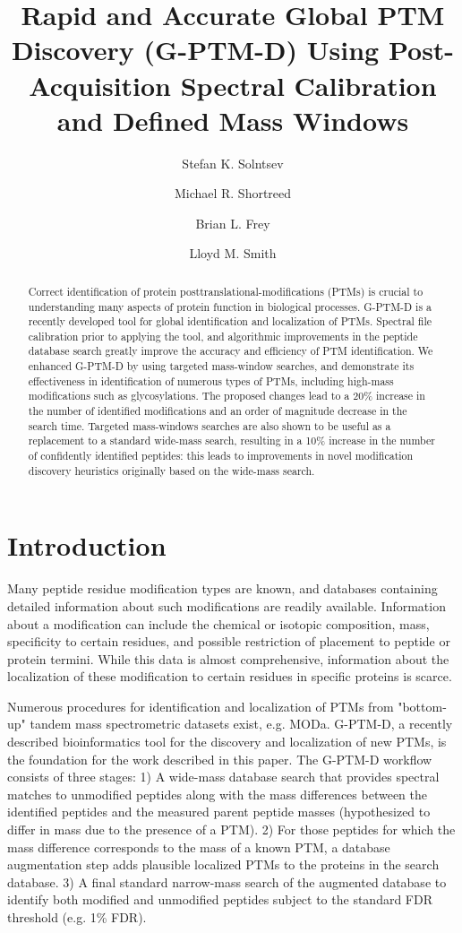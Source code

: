 \documentclass[journal=jprobs,manuscript=article]{achemso}
\author{Stefan K. Solntsev}
\author{Michael R. Shortreed}
\author{Brian L. Frey}
\author{Lloyd M. Smith}
\affiliation[UwMadison]
{University of Wisconsin-Madison}
\title[Rapid and Accurate Global PTM Discovery (G-PTM-D) Using Post-Acquisition Spectral Calibration and Defined Mass Windows]
  {Rapid and Accurate Global PTM Discovery (G-PTM-D) Using Post-Acquisition Spectral Calibration and Defined Mass Windows}
\begin{document}
\begin{abstract}

Correct identification of protein posttranslational-modifications (PTMs) is crucial to understanding many aspects of protein function in biological processes.
G-PTM-D\cite{Li_2016} is a recently developed tool for global identification and localization of PTMs.
Spectral file calibration prior to applying the tool, and algorithmic improvements in the peptide database search greatly improve the accuracy and efficiency of PTM identification.
We enhanced G-PTM-D by using targeted mass-window searches, and demonstrate its effectiveness in identification of numerous types of PTMs, including high-mass modifications such as glycosylations.
The proposed changes lead to a 20\% increase in the number of identified modifications and an order of magnitude decrease in the search time.
Targeted mass-windows searches are also shown to be useful as a replacement to a standard wide-mass search, resulting in a 10\% increase in the number of confidently identified peptides: this leads to improvements in novel modification discovery heuristics originally based on the wide-mass search.
\end{abstract}

\section{Introduction}

Many peptide residue modification types are known, and databases containing detailed information about such modifications are readily available.
Information about a modification can include the chemical or isotopic composition, mass, specificity to certain residues, and possible restriction of placement to peptide or protein termini.
While this data is almost comprehensive, information about the localization of these modification to certain residues in specific proteins is scarce.

Numerous procedures for identification and localization of PTMs from "bottom-up" tandem mass spectrometric datasets exist, e.g. MODa\cite{Na_2011}.
G-PTM-D\cite{Li_2016}, a recently described bioinformatics tool for the discovery and localization of new PTMs, is the foundation for the work described in this paper.
The G-PTM-D workflow consists of three stages: 1) A wide-mass database search\cite{Chick_2015, Na_2011} that provides spectral matches to unmodified peptides along with the mass differences between the identified peptides and the measured parent peptide masses (hypothesized to differ in mass due to the presence of a PTM).
2) For those peptides for which the mass difference corresponds to the mass of a known PTM, a database augmentation step adds plausible localized PTMs to the proteins in the search database.
3) A final standard narrow-mass search of the augmented database to identify both modified and unmodified peptides subject to the standard FDR threshold (e.g. 1\% FDR).
\end{document}
